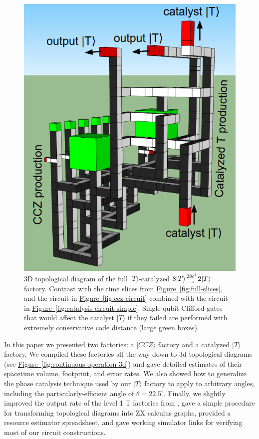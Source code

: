 \documentclass[twocolumn,accepted=2019-03-30]{quantumarticle}
\newcommand{\fig}[1]{\hyperref[fig:#1]{Figure~\ref*{fig:#1}}}
\newcommand{\factory}[3]{$#1 \genfrac{}{}{0pt}{}{#2}{\rightarrow} {#3}$ factory}
\begin{document}
\begin{figure}
  \label{fig:full-3d}
    \includegraphics[width=\textwidth,height=\dimexpr\textheight-6\baselineskip,keepaspectratio]{full-3d.png}
  \caption{
    3D topological diagram of the full $|T\rangle$-catalyzed \factory{8|T\rangle}{28\epsilon^2}{2|T\rangle}.
    Contrast with the time slices from \fig{full-slices}, and the circuit in \fig{ccz-circuit} combined with the circuit in \fig{catalysis-circuit-simple}.
    Single-qubit Clifford gates that would affect the catalyst $|T\rangle$ if they failed are performed with extremely conservative code distance (large green boxes).
  }
\end{figure}

In this paper we presented two factories: a $|CCZ\rangle$ factory and a catalyzed $|T\rangle$ factory.
We compiled these factories all the way down to 3d topological diagrams (see \fig{continuous-operation-3d}) and gave detailed estimates of their spacetime volume, footprint, and error rates.
We also showed how to generalize the phase catalysis technique used by our $|T\rangle$ factory to apply to arbitrary angles, including the particularly-efficient angle of $\theta=22.5^\circ$.
Finally, we slightly improved the output rate of the level 1 T factories from \cite{fowler2018}, gave a simple procedure for transforming topological diagrams into ZX calculus graphs, provided a resource estimator spreadsheet, and gave working simulator links for verifying most of our circuit constructions.
\end{document}
